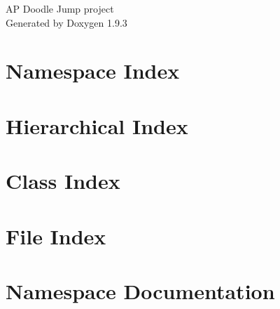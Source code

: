 \documentclass[twoside]{book}
\newcommand{\+}{\discretionary{\mbox{\scriptsize$\hookleftarrow$}}{}{}}
\newcommand{\clearemptydoublepage}{%
    \newpage{\pagestyle{empty}\cleardoublepage}%
  }
\begin{document}
  \raggedbottom
    \hypersetup{pageanchor=false,
                bookmarksnumbered=true,
                pdfencoding=unicode
               }
  \begin{titlepage}
  \vspace*{7cm}
  \begin{center}%
  {\Large AP Doodle Jump project}\\
  \vspace*{1cm}
  {\large Generated by Doxygen 1.9.3}\\
  \end{center}
  \end{titlepage}
  \clearemptydoublepage
  \tableofcontents
  \clearemptydoublepage
  \hypersetup{pageanchor=true}
\chapter{Namespace Index}

\chapter{Hierarchical Index}

\chapter{Class Index}

\chapter{File Index}

\chapter{Namespace Documentation}


\end{document}
